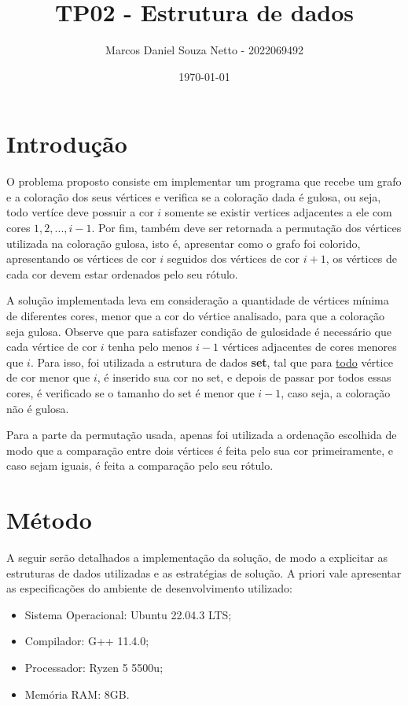 \documentclass{article}
\title{TP02 - Estrutura de dados}
\author{Marcos Daniel Souza Netto - 2022069492}
\date{\today}
\begin{document}
\maketitle

\section{Introdução}

O problema proposto consiste em implementar um programa que recebe um grafo 
e a coloração dos seus vértices e verifica se a coloração dada é gulosa, ou seja,
todo vertíce deve possuir a cor $i$ somente se existir vertices adjacentes
a ele com cores $1, 2, ..., i-1$. Por fim, também deve ser retornada a permutação
dos vértices utilizada na coloração gulosa, isto é, apresentar como o grafo foi 
colorido, apresentando os vértices de cor $i$ seguidos dos vértices de cor $i+1$, 
os vértices de cada cor devem estar ordenados pelo seu rótulo.

A solução implementada leva em consideração a quantidade de vértices mínima de diferentes cores, 
menor que a cor do vértice analisado, para que a coloração seja gulosa. Observe que para satisfazer 
condição de gulosidade é necessário que cada vértice de cor $i$ tenha pelo menos $i-1$ vértices adjacentes 
de cores menores que $i$. Para isso, foi utilizada a estrutura de dados \textbf{set}, tal que para \underline{todo} vértice
de cor menor que $i$, é inserido sua cor no set, e depois de passar por todos essas cores, é verificado se o tamanho do set 
é menor que $i-1$, caso seja, a coloração não é gulosa.

Para a parte da permutação usada, apenas foi utilizada a ordenação escolhida de modo que a comparação entre dois vértices é feita 
pelo sua cor primeiramente, e caso sejam iguais, é feita a comparação pelo seu rótulo.

\section{Método}

A seguir serão detalhados a implementação da solução, de modo a explicitar 
as estruturas de dados utilizadas e as estratégias de solução. A priori vale 
apresentar as especificações do ambiente de desenvolvimento utilizado:

\begin{itemize}
    \item Sistema Operacional: Ubuntu 22.04.3 LTS;
    \item Compilador: G++ 11.4.0;
    \item Processador: Ryzen 5 5500u;
    \item Memória RAM: 8GB.
\end{itemize}
\end{document}
